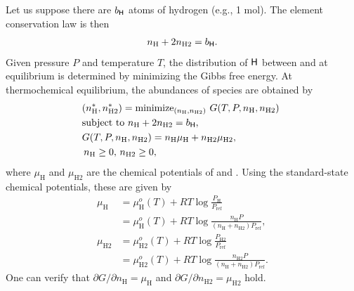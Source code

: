 Let us suppose there are $b_{\mathsf{H}}$ atoms of hydrogen (e.g., 1 mol). The element conservation law is then
\begin{align}
    n_\mathrm{H} + 2 n_\mathrm{H2}  = b_{\mathsf{H}}.
\end{align}
Given pressure $P$ and temperature $T$, the distribution of $\mathsf{H}$ between  and  at equilibrium is determined by minimizing the Gibbs free energy. At thermochemical equilibrium, the abundances of species are obtained by
\begin{align}
\label{eq:opt1tce}
    &(n_\mathrm{H}^\ast, n_\mathrm{H2}^\ast) = \mathrm{minimize}_{(n_\mathrm{H}, n_\mathrm{H2})} \,\, G(T, P, n_\mathrm{H}, n_\mathrm{H2}) \,\, \\ 
    &\mbox{subject to} \,\, n_\mathrm{H} + 2 n_\mathrm{H2} =  b_{\mathsf{H}},  \\
    &G(T, P, n_\mathrm{H}, n_\mathrm{H2}) = n_\mathrm{H} \mu_\mathrm{H} + n_\mathrm{H2} \mu_\mathrm{H2}, \\
     &\, n_\mathrm{H} \ge 0, \, n_\mathrm{H2} \ge 0,
\end{align}
where $\mu_\mathrm{H}$ and $\mu_\mathrm{H2}$ are the chemical potentials of  and . Using the standard-state chemical potentials, these are given by
\begin{align}
    \mu_\mathrm{H} &= \mu_\mathrm{H}^o(T) + RT \log{\frac{P_\mathrm{H}}{P_\mathrm{ref}}} \\
    &=  \mu_\mathrm{H}^o(T) + RT \log{\frac{n_\mathrm{H} P}{(n_\mathrm{H} + n_\mathrm{H2}) P_\mathrm{ref}}}, \\
    \mu_\mathrm{H2} &= \mu_\mathrm{H2}^o(T) + RT \log{\frac{P_\mathrm{H2}}{P_\mathrm{ref}}} \\
    &=  \mu_\mathrm{H2}^o(T) + RT\log{\frac{n_\mathrm{H2} P}{(n_\mathrm{H} + n_\mathrm{H2}) P_\mathrm{ref}}}.
\end{align}
One can verify that $\partial G/\partial n_\mathrm{H} = \mu_\mathrm{H}$ and $\partial G/\partial n_\mathrm{H2} = \mu_\mathrm{H2}$ hold.

